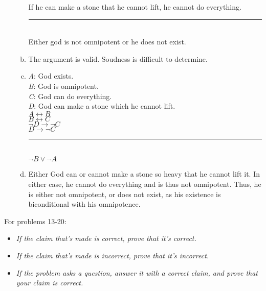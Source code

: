\documentclass{article}
\begin{document}
\begin{enumerate}
\begin{enumerate}[(a)]
                        If he can make a stone that he cannot lift, he cannot do everything.\\
                        \rule{15em}{.5pt}\\
                        Either god is not omnipotent or he does not exist.
                  \item The argument is valid. Soudness is difficult to determine.\\
                  \item \textit{A}: God exists.\\
                        \textit{B}: God is omnipotent.\\
                        \textit{C}: God can do everything.\\
                        \textit{D}: God can make a stone which he cannot lift.\\

                        $A \leftrightarrow B$\\
                        $B \leftrightarrow C$\\
                        $\neg D \to \neg C$\\
                        $D \to \neg C$\\
                        \rule{5em}{.5pt}\\
                        $\neg B \lor \neg A$
                  \setcounter{enumii}{4}
                  \item Either God can or cannot make a stone so heavy that he cannot lift it. In either case, he cannot do everything and is thus not omnipotent. Thus, he is either not omnipotent, or does not exist, as his existence is biconditional with his omnipotence.
            \end{enumerate}
\end{enumerate}

\begin{flushleft}
      For problems 13-20:
\end{flushleft}

\begin{itemize}
      \item \textit{If the claim that's made is correct, prove that it's correct.}
      \item \textit{If the claim that's made is incorrect, prove that it's incorrect.}
      \item \textit{If the problem asks a question, answer it with a correct claim, and prove that your
                  claim is correct.}
\end{itemize}
\end{document}
